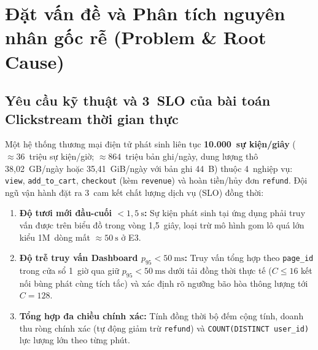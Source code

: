 \documentclass[13pt,a4paper]{report}
\begin{document}
\section{Đặt vấn đề và Phân tích nguyên nhân gốc rễ (Problem \& Root Cause)}
\subsection{Yêu cầu kỹ thuật và 3~SLO của bài toán Clickstream thời gian thực}
Một hệ thống thương mại điện tử phát sinh liên tục \textbf{10.000~sự kiện/giây} ($\approx 36$~triệu sự kiện/giờ; $\approx 864$~triệu bản ghi/ngày, dung lượng thô 38,02~GB/ngày hoặc 35,41~GiB/ngày với bản ghi 44~B) thuộc 4~nghiệp vụ: \texttt{view}, \texttt{add\_\allowbreak{}to\_\allowbreak{}cart}, \texttt{checkout} (kèm \texttt{revenue}) và hoàn tiền/hủy đơn \texttt{refund}. Đội ngũ vận hành đặt ra 3~cam kết chất lượng dịch vụ (SLO) đồng thời:
\begin{enumerate}
    \setlength{\itemsep}{3pt}\setlength{\parskip}{0pt}
    \item \textbf{Độ tươi mới đầu-cuối $< 1{,}5~\text{s}$:} Sự kiện phát sinh tại ứng dụng phải truy vấn được trên biểu đồ trong vòng 1,5~giây, loại trừ mô hình gom lô quá lớn kiểu 1M~dòng mất $\approx 50~\text{s}$ ở E3.
    \item \textbf{Độ trễ truy vấn Dashboard $p_{95} < 50~\text{ms}$:} Truy vấn tổng hợp theo \texttt{page\_\allowbreak{}id} trong cửa sổ 1~giờ qua giữ $p_{95} < 50~\text{ms}$ dưới tải đồng thời thực tế ($C \le 16$ kết nối bùng phát cùng tích tắc) và xác định rõ ngưỡng bão hòa thông lượng tới $C = 128$.
    \item \textbf{Tổng hợp đa chiều chính xác:} Tính đồng thời bộ đếm cộng tính, doanh thu ròng chính xác (tự động giảm trừ \texttt{refund}) và \texttt{COUNT(\allowbreak{}DISTINCT user\_\allowbreak{}id)} lực lượng lớn theo từng phút.
\end{enumerate}
\end{document}
